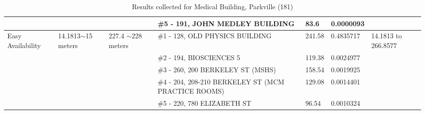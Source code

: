 \begin{table}[H]
{\begin{tabular}{|l|l|l|l|l|l|l|}
                        &                          &                                                 & \#5 - 191, JOHN MEDLEY BUILDING                       & 83.6          & 0.0000093       &                           \\ \hline
Easy Availability       & 14.1813$\sim$15 meters   & 227.4 $\sim$228  meters                         & \#1 - 128, OLD PHYSICS BUILDING                       & 241.58        & 0.4835717       & 14.1813 to 266.8577       \\ \hline
                        &                          &                                                 & \#2 - 194, BIOSCIENCES 5                              & 119.38        & 0.0024977       &                           \\ \hline
                        &                          &                                                 & \#3 - 260, 200 BERKELEY ST (MSHS)                     & 158.54        & 0.0019925       &                           \\ \hline
                        &                          &                                                 & \#4 - 204, 208-210 BERKELEY ST (MCM PRACTICE ROOMS)   & 129.08        & 0.0014401       &                           \\ \hline
                        &                          &                                                 & \#5 - 220, 780 ELIZABETH ST                           & 96.54         & 0.0010324       &                           \\ \hline
\end{tabular}


}
\caption{Results collected for Medical Building, Parkville (181)}
\label{appendix:med}
\end{table}

